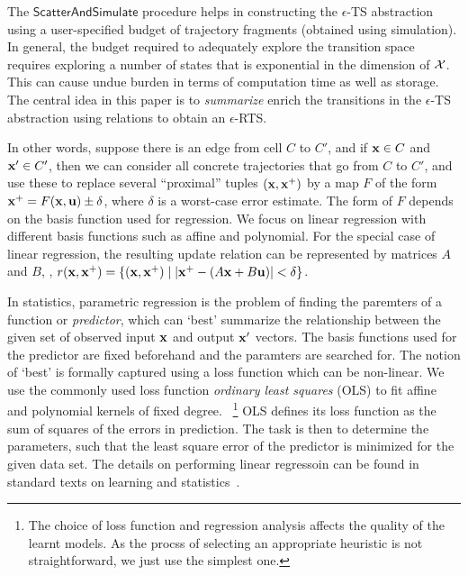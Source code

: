 The $\mathsf{ScatterAndSimulate}$ procedure helps in constructing the
$\epsilon$-TS abstraction using a user-specified budget of trajectory
fragments (obtained using simulation).  In general, the budget
required to adequately explore the transition space requires exploring
a number of states that is exponential in the dimension of
$\mathcal{X}$.  This can cause undue burden in terms of computation
time as well as storage.  The central idea in this paper is to {\em
summarize} enrich the transitions in the $\epsilon$-TS abstraction
using relations to obtain an $\epsilon$-RTS. 

In other words, suppose there is an edge from cell $C$ to $C'$, and if
$\mathbf{x} \in C$ and $\mathbf{x}' \in C'$, then we can consider all concrete
trajectories that go from $C$ to $C'$, and use these to replace
several ``proximal'' tuples $(\mathbf{x},\mathbf{x}^{+})$ by a map $F$ of the form
$\mathbf{x}^{+} = F(\mathbf{x}, \mathbf{u}) \pm \delta$, where $\delta$ is a worst-case error
estimate. The form of $F$ depends on the basis function used for
regression. We focus on linear regression with different basis
functions such as affine and polynomial. For the special case of
linear regression, the resulting update relation can be represented by
matrices $A$ and $B$, \ie, $r(\mathbf{x},\mathbf{x}^{+}) = \{(\mathbf{x},\mathbf{x}^{+}) \mid |\mathbf{x}^{+}
- (A\mathbf{x} + B\mathbf{u})| < \delta\}$.

In statistics, parametric regression is the problem of finding the
paremters of a function or \textit{predictor}, which can `best'
summarize the relationship between the given set of observed input
$\mathbf{x}$ and output $\mathbf{x}'$ vectors. The basis functions used for the
predictor are fixed beforehand and the paramters are searched for.
The notion of `best' is formally captured using a loss function which
can be non-linear. We use the commonly used loss function
\textit{ordinary least squares} (OLS) to fit affine and polynomial
kernels of fixed degree.  ~\footnote{The choice of loss function and
regression analysis affects the quality of the learnt models. As the
procss of selecting an appropriate heuristic is not straightforward,
we just use the simplest one.} OLS defines its loss function as the
sum of squares of the errors in prediction. The task is then to
determine the parameters, such that the least square error of the
predictor is minimized for the given data set.  The details on
performing linear regressoin can be found in standard texts on
learning and statistics~\cite{friedman2001elements}.



